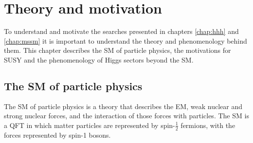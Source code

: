 \chapter{Theory and motivation}
\label{chap:theory}
To understand and motivate the searches presented in chapters 
\ref{chap:hhh} and \ref{chap:mssm} it is important
to understand the theory and phenomenology behind them. 
This chapter describes the \acl{SM} of particle physics, the
motivations for \acl{SUSY} and the phenomenology of Higgs
sectors beyond the \acl{SM}.

\section{The \acl{SM} of particle physics}
\label{sec:theory_sm}
The \ac{SM} of particle physics is a theory that describes the \ac{EM}, weak nuclear and strong
nuclear forces, and the interaction of those forces
with particles. The \ac{SM} is a \ac{QFT} in which matter particles
are represented by spin-$\frac{1}{2}$ fermions, with the forces represented
by spin-1 bosons.

